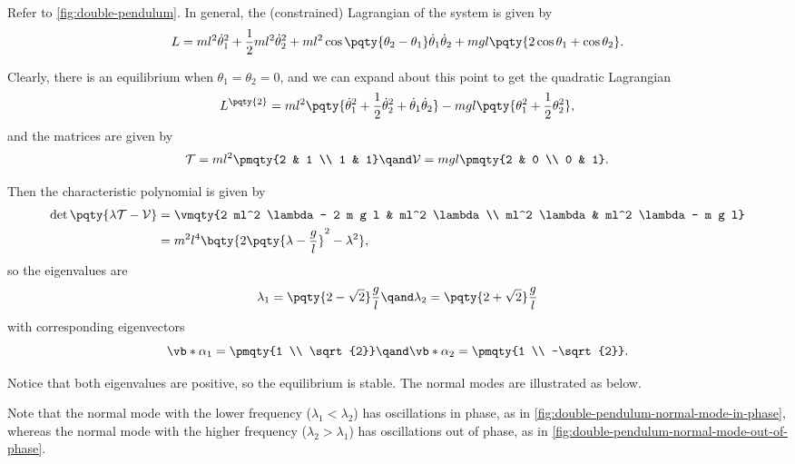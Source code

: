 \begin{example}
    Refer to \autoref{fig:double-pendulum}. In general, the (constrained) Lagrangian of the system is given by
    \begin{equation}
        L = m l^2 \dot{\theta}_1^2 + \frac{1}{2} m l^2 \dot{\theta}_2^2 + m l^2 \cos\pqty{\theta_2 - \theta_1} \dot{\theta}_1 \dot{\theta}_2 + m g l \pqty{2 \cos \theta_1 + \cos \theta_2}.
    \end{equation}

    Clearly, there is an equilibrium when \(\theta_1 = \theta_2 = 0\), and we can expand about this point to get the quadratic Lagrangian
    \begin{equation}
        L^{\pqty{2}} = m l^2 \pqty{\dot{\theta}_1^2 + \frac{1}{2} \dot{\theta}_2^2 + \dot{\theta}_1 \dot{\theta}_2} - m g l \pqty{\theta_1^2 + \frac{1}{2} \theta_2^2},
    \end{equation}
    and the matrices are given by
    \begin{equation}
        \mathcal{T} = m l^2 \pmqty{2 & 1 \\ 1 & 1} \qand \mathcal{V} = m g l \pmqty{2 & 0 \\ 0 & 1}.
    \end{equation}

    Then the characteristic polynomial is given by
    \begin{subequations}
        \begin{align}
            \det\pqty{\lambda \mathcal{T} - \mathcal{V}} &= \vmqty{2 ml^2 \lambda - 2 m g l & ml^2 \lambda \\ ml^2 \lambda & ml^2 \lambda - m g l} \\
            &= m^2 l^4 \bqty{2 \pqty{\lambda - \frac{g}{l}}^2 - \lambda^2},
        \end{align}
    \end{subequations}
    so the eigenvalues are
    \begin{equation}
        \lambda_1 = \pqty{2 - \sqrt{2}} \frac{g}{l} \qand \lambda_2 = \pqty{2 + \sqrt{2}} \frac{g}{l}
    \end{equation}
    with corresponding eigenvectors
    \begin{equation}
        \vb*{\alpha}_1 = \pmqty{1 \\ \sqrt{2}} \qand \vb*{\alpha}_2 = \pmqty{1 \\ -\sqrt{2}}.
    \end{equation}

    Notice that both eigenvalues are positive, so the equilibrium is stable. The normal modes are illustrated as below.

    Note that the normal mode with the lower frequency (\(\lambda_1 < \lambda_2\)) has oscillations in phase, as in \autoref{fig:double-pendulum-normal-mode-in-phase}, whereas the normal mode with the higher frequency (\(\lambda_2 > \lambda_1\)) has oscillations out of phase, as in \autoref{fig:double-pendulum-normal-mode-out-of-phase}.
\end{example}


